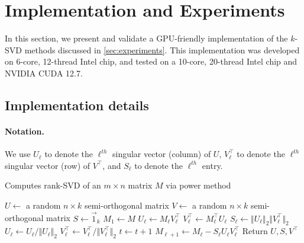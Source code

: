 
\newpage
\section{Implementation and Experiments} \label{app:experiments}

In this section, we present and validate a GPU-friendly implementation of the $k$-SVD methods discussed in \textsection \ref{sec:experiments}. This implementation was developed on 6-core, 12-thread Intel chip, and tested on a 10-core, 20-thread Intel chip and NVIDIA CUDA 12.7.

\subsection{Implementation details}

\paragraph{Notation.} We use $U_\ell$ to denote the $\ell^{th}$ singular vector (column) of $U$,  $V^\top_\ell$ to denote the $\ell^{th}$ singular vector (row) of $V^\top$, and $S_\ell$ to denote the $\ell^{th}$ entry.


\begin{algorithm}
\caption{Computes rank-SVD of an $m\times n$ matrix $M$ via power method}\label{alg:powermethod}
\begin{algorithmic}
    \State $U \gets$ a random $n \times k$ semi-orthogonal matrix
    \State $V \gets$ a random $n \times k$ semi-orthogonal matrix
    \State$S \gets \vec{1}_k$
    \State $M_1 \gets M$
            \State $U_\ell \gets M_\ell V^\top_\ell$
            \State$V^\top_\ell \gets M_\ell^\top U_\ell$
            \State $S_\ell \gets \Vert U_\ell\Vert_2\Vert V^\top_\ell\Vert_2$
            \State $U_\ell \gets  U_\ell/\Vert U_\ell\Vert_2$
            \State $V^\top_\ell \gets V^\top_\ell/ \Vert V^\top_\ell\Vert _2$
            \State$t\gets t+1$
        \EndWhile
        \State$M_{\ell+1} \gets M_\ell - S_\ell U_\ell V^\top_\ell$
    \EndFor 
\State Return $U,S,V^\top$ 
\end{algorithmic}
\end{algorithm}



